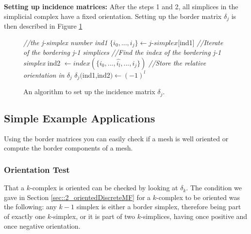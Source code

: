 \textbf{Setting up incidence matrices:}
After the steps 1 and 2, all simplices in the simplicial complex have a fixed orientation. Setting up the border matrix $\delta_j$ is then described in Figure \ref{alg:deltaj} 

\begin{figure}

\begin{algorithmic}
	\STATE \emph{//the j-simplex number ind1}
	\STATE $\{i_0,...,i_j\} \gets j$-$simplex[$ind1$]$   
	\STATE \emph{//Iterate of the bordering j-1 simplices}
		\STATE \emph{//Find the index of the bordering j-1 simplex}
		\STATE ind2 $\gets index(\{i_0,...,\widehat{i_l},...,i_j\})$ 
		\STATE \emph{//Store the relative orientation in $\delta_j$}
		\STATE $\delta_j($ind1,ind2$) \gets (-1)^l$
	\ENDFOR
\ENDFOR
\end{algorithmic}
\caption{An algorithm to set up the incidence matrix $\delta_j$.}
\label{alg:deltaj}
\end{figure}
		
\subsection{Simple Example Applications}
Using the border matrices you can easily check if a mesh is well oriented or compute the border components of a mesh.

	
\subsubsection{Orientation Test}
That a $k$-complex is oriented can be checked by looking at $\delta_k$. The condition we gave in Section \ref{sec::2_orientedDiscreteMF} for a $k$-complex to be oriented was the following: any $k-1$ simplex is either a border simplex, therefore being part of exactly one $k$-simplex, or it is part of two $k$-simplices, having once positive and once negative orientation. 

